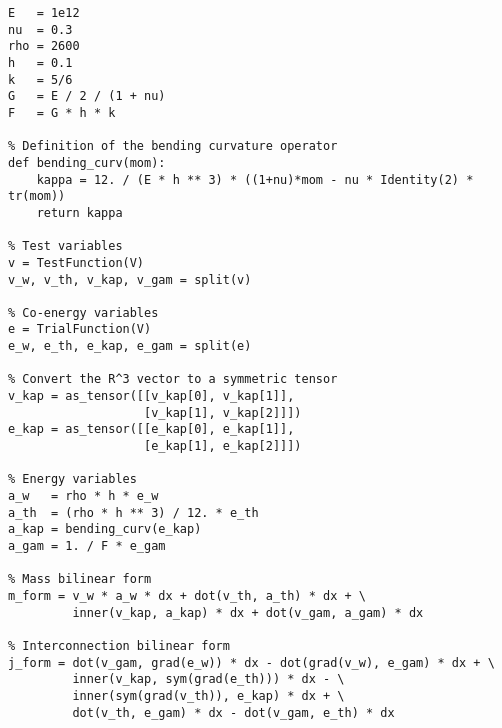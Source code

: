 \begin{tcolorbox}[title = Definition of the variational form (\fenics \& \firedrake), coltitle=white, breakable, size=fbox, boxrule=1pt, pad at break*=1mm, enlarge top by=0.25em, enlarge bottom by=0.5em]
\begin{Verbatim}[tabsize=4]
% Physical parameters 
E   = 1e12
nu  = 0.3	
rho = 2600
h   = 0.1
k   = 5/6	
G   = E / 2 / (1 + nu)
F   = G * h * k

% Definition of the bending curvature operator
def bending_curv(mom):
	kappa = 12. / (E * h ** 3) * ((1+nu)*mom - nu * Identity(2) * tr(mom))
	return kappa
	
% Test variables
v = TestFunction(V)
v_w, v_th, v_kap, v_gam = split(v)	

% Co-energy variables
e = TrialFunction(V)
e_w, e_th, e_kap, e_gam = split(e)

% Convert the R^3 vector to a symmetric tensor
v_kap = as_tensor([[v_kap[0], v_kap[1]],
				   [v_kap[1], v_kap[2]]])
e_kap = as_tensor([[e_kap[0], e_kap[1]],
				   [e_kap[1], e_kap[2]]])
			
% Energy variables   
a_w   = rho * h * e_w
a_th  = (rho * h ** 3) / 12. * e_th
a_kap = bending_curv(e_kap)
a_gam = 1. / F * e_gam

% Mass bilinear form 
m_form = v_w * a_w * dx + dot(v_th, a_th) * dx + \
		 inner(v_kap, a_kap) * dx + dot(v_gam, a_gam) * dx 

% Interconnection bilinear form
j_form = dot(v_gam, grad(e_w)) * dx - dot(grad(v_w), e_gam) * dx + \
		 inner(v_kap, sym(grad(e_th))) * dx - \
		 inner(sym(grad(v_th)), e_kap) * dx + \
		 dot(v_th, e_gam) * dx - dot(v_gam, e_th) * dx
\end{Verbatim}
\end{tcolorbox}

